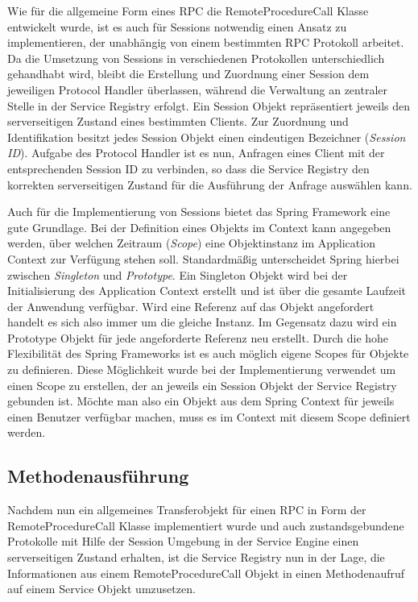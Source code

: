 Wie für die allgemeine Form eines \ac{RPC} die RemoteProcedureCall Klasse
entwickelt wurde, ist es auch für Sessions notwendig einen Ansatz zu
implementieren, der unabhängig von einem bestimmten \ac{RPC} Protokoll arbeitet.
Da die Umsetzung von Sessions in verschiedenen Protokollen unterschiedlich
gehandhabt wird, bleibt die Erstellung und Zuordnung einer Session dem jeweiligen
Protocol Handler überlassen, während die Verwaltung an zentraler Stelle in der
Service Registry erfolgt. Ein Session Objekt repräsentiert jeweils den
serverseitigen Zustand eines bestimmten Clients. Zur Zuordnung und Identifikation
besitzt jedes Session Objekt einen eindeutigen Bezeichner (\emph{Session ID}).
Aufgabe des Protocol Handler ist es nun, Anfragen eines Client mit der
entsprechenden Session ID zu verbinden, so dass die Service Registry den
korrekten serverseitigen Zustand für die Ausführung der Anfrage auswählen
kann.

Auch für die Implementierung von Sessions bietet das Spring Framework eine gute
Grundlage. Bei der Definition eines Objekts im Context kann angegeben werden,
über welchen Zeitraum (\emph{Scope}) eine Objektinstanz im Application Context
zur Verfügung stehen soll. Standardmäßig unterscheidet Spring hierbei zwischen
\emph{Singleton} und \emph{Prototype}. Ein Singleton Objekt wird bei der
Initialisierung des Application Context erstellt und ist über die gesamte
Laufzeit der Anwendung verfügbar. Wird eine Referenz auf das Objekt angefordert
handelt es sich also immer um die gleiche Instanz. Im Gegensatz dazu wird ein
Prototype Objekt für jede angeforderte Referenz neu erstellt. Durch die hohe
Flexibilität des Spring Frameworks ist es auch möglich eigene Scopes für
Objekte zu definieren. Diese Möglichkeit wurde bei der Implementierung
verwendet um einen Scope zu erstellen, der an jeweils ein Session Objekt der
Service Registry gebunden ist. Möchte man also ein Objekt aus dem Spring
Context für jeweils einen Benutzer verfügbar machen, muss es im Context mit
diesem Scope definiert werden.

\subsection{Methodenausführung}\label{subsec:dispatcher}
Nachdem nun ein allgemeines Transferobjekt für einen \ac{RPC} in Form der
RemoteProcedureCall Klasse implementiert wurde und auch zustandsgebundene
Protokolle mit Hilfe der Session Umgebung in der Service Engine einen
serverseitigen Zustand erhalten, ist die Service Registry nun in der Lage,
die Informationen aus einem RemoteProcedureCall Objekt in einen Methodenaufruf
auf einem Service Objekt umzusetzen.

